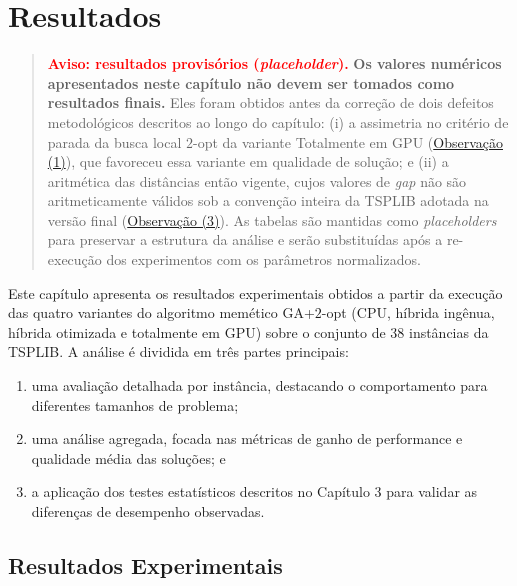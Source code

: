 \chapter{Resultados}\label{cap4-resultados}

\begin{quote}
  \textbf{\textcolor{red}{Aviso: resultados provisórios (\emph{placeholder}).}}\label{obs-placeholder}
  \textbf{Os valores numéricos apresentados neste capítulo não devem ser tomados como resultados finais.}
  Eles foram obtidos antes da correção de dois defeitos metodológicos descritos ao longo do capítulo: (i) a assimetria no critério de parada da busca local \(2\)-opt da variante Totalmente em GPU (\hyperref[obs-fullgpu-iteracoes]{Observação (1)}), que favoreceu essa variante em qualidade de solução; e (ii) a aritmética das distâncias então vigente, cujos valores de \emph{gap} não são aritmeticamente válidos sob a convenção inteira da TSPLIB adotada na versão final (\hyperref[obs-aritmetica]{Observação (3)}).
  As tabelas são mantidas como \emph{placeholders} para preservar a estrutura da análise e serão substituídas após a re-execução dos experimentos com os parâmetros normalizados.
\end{quote}

Este capítulo apresenta os resultados experimentais obtidos a partir da execução das quatro variantes do algoritmo memético GA+\(2\)-opt (CPU, híbrida ingênua, híbrida otimizada e totalmente em GPU) sobre o conjunto de 38 instâncias da TSPLIB.
A análise é dividida em três partes principais:

\begin{enumerate}
  \def\labelenumi{\arabic{enumi}.}
  \tightlist
  \item
        uma avaliação detalhada por instância, destacando o comportamento para
        diferentes tamanhos de problema;
  \item
        uma análise agregada, focada nas métricas de ganho de performance e
        qualidade média das soluções; e
  \item
        a aplicação dos testes estatísticos descritos no Capítulo 3 para
        validar as diferenças de desempenho observadas.
\end{enumerate}

\section{Resultados Experimentais}\label{sec-41-resultados-experimentais}

